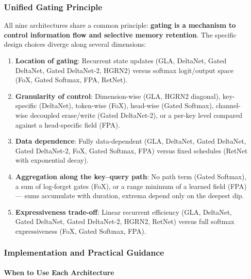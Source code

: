 \normalsize

\subsubsection{Unified Gating Principle}

All nine architectures share a common principle: \textbf{gating is a mechanism to control information flow and selective memory retention}. The specific design choices diverge along several dimensions:

\begin{enumerate}[leftmargin=*]
    \item \textbf{Location of gating}: Recurrent state updates (GLA, DeltaNet, Gated DeltaNet, Gated DeltaNet-2, HGRN2) versus softmax logit/output space (FoX, Gated Softmax, FPA, RetNet).
    \item \textbf{Granularity of control}: Dimension-wise (GLA, HGRN2 diagonal), key-specific (DeltaNet), token-wise (FoX), head-wise (Gated Softmax), channel-wise decoupled erase/write (Gated DeltaNet-2), or a per-key level compared against a head-specific field (FPA).
    \item \textbf{Data dependence}: Fully data-dependent (GLA, DeltaNet, Gated DeltaNet, Gated DeltaNet-2, FoX, Gated Softmax, FPA) versus fixed schedules (RetNet with exponential decay).
    \item \textbf{Aggregation along the key--query path}: No path term (Gated Softmax), a sum of log-forget gates (FoX), or a range minimum of a learned field (FPA) --- sums accumulate with duration, extrema depend only on the deepest dip.
    \item \textbf{Expressiveness trade-off}: Linear recurrent efficiency (GLA, DeltaNet, Gated DeltaNet, Gated DeltaNet-2, HGRN2, RetNet) versus full softmax expressiveness (FoX, Gated Softmax, FPA).
\end{enumerate}

\subsubsection{Implementation and Practical Guidance}

\paragraph{When to Use Each Architecture}

